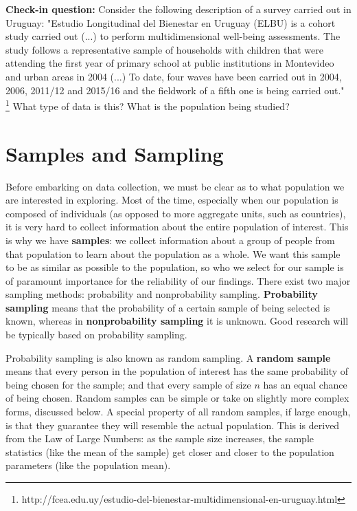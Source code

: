 \documentclass{book}
\newenvironment{shaded*}{
    \begin{center}
    \begin{tabular}{|p{0.9\textwidth}|}
    \hline\\
    }
    { 
    \\\\\hline
    \end{tabular} 
    \end{center}
}
\begin{document}
\begin{shaded*}

\textbf{Check-in question:} Consider the following description of a survey
carried out in Uruguay: "Estudio Longitudinal del Bienestar en Uruguay (ELBU)
is a cohort study carried out (...) to perform multidimensional well-being
assessments. The study follows a representative sample of households with
children that were attending the first year of primary school at public
institutions in Montevideo and urban areas in 2004 (...) To date, four waves
have been carried out in 2004, 2006, 2011/12 and 2015/16 and the fieldwork of
a fifth one is being carried out." \footnote{http://fcea.edu.uy/estudio-del-bienestar-multidimensional-en-uruguay.html}
What type of data is this? What is the population being studied?

\end{shaded*}

\hypertarget{samples-and-sampling}{%
\section{Samples and Sampling}\label{samples-and-sampling}}

Before embarking on data collection, we must be clear as to what population we
are interested in exploring. Most of the time, especially when our population
is composed of individuals (as opposed to more aggregate units, such as
countries), it is very hard to collect information about the entire population
of interest. This is why we have \textbf{samples}: we collect information
about a group of people from that population to learn about the population as
a whole. We want this sample to be as similar as possible to the population,
so who we select for our sample is of paramount importance for the reliability
of our findings. There exist two major sampling methods: probability and
nonprobability sampling. \textbf{Probability sampling} means that the
probability of a certain sample of being selected is known, whereas in
\textbf{nonprobability sampling} it is unknown. Good research will be
typically based on probability sampling.

Probability sampling is also known as random sampling. A \textbf{random
sample} means that every person in the population of interest has the same
probability of being chosen for the sample; and that every sample of size
\(n\) has an equal chance of being chosen. Random samples can be simple or
take on slightly more complex forms, discussed below. A special property of
all random samples, if large enough, is that they guarantee they will resemble
the actual population. This is derived from the Law of Large Numbers: as the
sample size increases, the sample statistics (like the mean of the sample) get
closer and closer to the population parameters (like the population mean).
\end{document}
